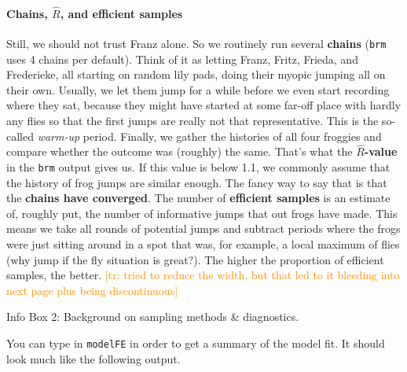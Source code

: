 \documentclass[nobib]{tufte-handout}
\newcommand{\tr}[1]{\textcolor{DarkOrange}{[tr: #1]}}
\begin{document}
\begin{InfoBox}[]
{\begin{minipage}{1\textwidth}
\paragraph{Chains, $\hat{R}$, and efficient samples}      
    Still, we should not trust Franz alone. So we routinely run several
    \textbf{chains} (\texttt{brm} uses 4 chains per default). Think of it as letting Franz,
    Fritz, Frieda, and Frederieke, all starting on random lily pads, doing their myopic jumping
    all on their own. Usually, we let them jump for a while before we even start recording
    where they sat, because they might have started at some far-off place with hardly any flies so that the first jumps are really not that representative. This is the so-called
    \emph{warm-up} period. Finally, we gather the histories of all four froggies and compare
    whether the outcome was (roughly) the same. That's what the \textbf{$\hat{R}$-value} in the
    \texttt{brm} output gives us. If this value is below 1.1, we commonly assume that the
    history of frog jumps are similar enough. The fancy way to say that is that the \textbf{chains have
      converged}. The number of \textbf{efficient samples} is an estimate of, roughly put, the
    number of informative jumps that out frogs have made. This means we take all rounds of potential jumps and subtract periods where the frogs
    were just sitting around in a spot that was, for example, a local maximum of flies (why jump if the fly situation is great?). The
    higher the proportion of efficient samples, the better.
    \tr{tried to reduce the width, but that led to it bleeding into next page plus being discontinuous}
    
  \end{minipage} \par
  } \par
  \begin{center}
    Info Box 2: Background on sampling methods \& diagnostics.
  \end{center}
\end{InfoBox}


You can type in \texttt{modelFE} in order to get a summary of the model fit. It should look much like the following output.

\bigskip
\end{document}

